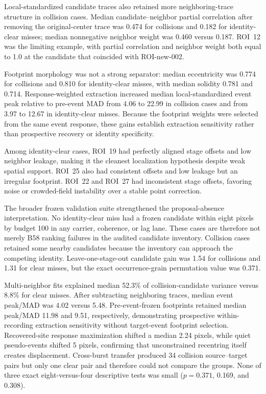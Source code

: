Local-standardized candidate traces also retained more neighboring-trace
structure in collision cases. Median candidate--neighbor partial correlation
after removing the original-center trace was 0.474 for collisions and 0.182
for identity-clear misses; median nonnegative neighbor weight was 0.460 versus
0.187. ROI~12 was the limiting example, with partial correlation and neighbor
weight both equal to 1.0 at the candidate that coincided with ROI-new-002.

Footprint morphology was not a strong separator: median eccentricity was 0.774
for collisions and 0.810 for identity-clear misses, with median solidity 0.781
and 0.714. Response-weighted extraction increased median local-standardized
event peak relative to pre-event MAD from 4.06 to 22.99 in collision cases and
from 3.97 to 12.67 in identity-clear misses. Because the footprint weights were
selected from the same event response, these gains establish extraction
sensitivity rather than prospective recovery or identity specificity.

Among identity-clear cases, ROI~19 had perfectly aligned stage offsets and low
neighbor leakage, making it the cleanest localization hypothesis despite weak
spatial support. ROI~25 also had consistent offsets and low leakage but an
irregular footprint. ROI~22 and ROI~27 had inconsistent stage offsets, favoring
noise or crowded-field instability over a stable point correction.

The broader frozen validation suite strengthened the proposal-absence
interpretation. No identity-clear miss had a frozen candidate within eight
pixels by budget 100 in any carrier, coherence, or lag lane. These cases are
therefore not merely B58 ranking failures in the audited candidate inventory.
Collision cases retained some nearby candidates because the inventory can
approach the competing identity. Leave-one-stage-out candidate gain was 1.54
for collisions and 1.31 for clear misses, but the exact occurrence-grain
permutation value was 0.371.

Multi-neighbor fits explained median 52.3\% of collision-candidate variance
versus 8.8\% for clear misses. After subtracting neighboring traces, median
event peak/MAD was 4.02 versus 5.48. Pre-event-frozen footprints retained
median peak/MAD 11.98 and 9.51, respectively, demonstrating prospective
within-recording extraction sensitivity without target-event footprint
selection. Recovered-site response maximization shifted a median 2.24 pixels,
while quiet pseudo-events shifted 5 pixels, confirming that unconstrained
recentring itself creates displacement. Cross-burst transfer produced 34
collision source--target pairs but only one clear pair and therefore could not
compare the groups. None of three exact eight-versus-four descriptive tests
was small ($p=0.371$, 0.169, and 0.308).

